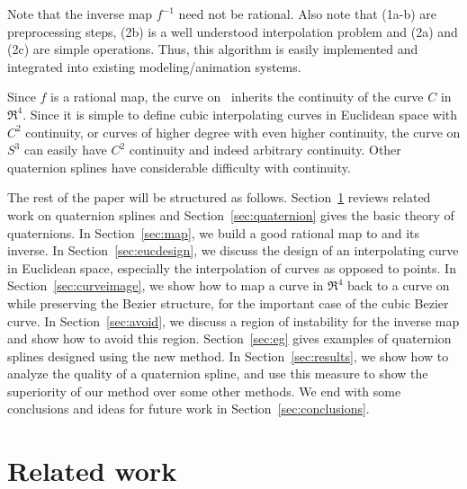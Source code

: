 Note that the inverse map $f^{-1}$ need not be rational.
Also note that (1a-b) are preprocessing steps,
(2b) is a well understood interpolation problem
and (2a) and (2c) are simple operations.
Thus, this algorithm is easily implemented and integrated into
existing modeling/animation systems.

Since $f$ is a rational map,
the curve on \ inherits the continuity of the curve $C$ in $\Re^4$.
Since it is simple to define cubic interpolating curves
in Euclidean space with $C^2$ continuity, or curves of higher degree with
even higher continuity, the curve on $S^3$ can easily have $C^2$ continuity
and indeed arbitrary continuity.
Other quaternion splines have considerable difficulty with continuity.

The rest of the paper will be structured as follows.
Section~\ref{sec:prevwork} reviews related work on quaternion splines
and Section~\ref{sec:quaternion} gives the basic theory of quaternions.
In Section~\ref{sec:map}, we build a good rational map to  and its inverse.
In Section~\ref{sec:eucdesign},
we discuss the design of an interpolating curve in Euclidean space,
especially the interpolation of curves as opposed to points. 
In Section~\ref{sec:curveimage}, we show how to map a curve in $\Re^4$
back to a curve on  while preserving the Bezier structure,
for the important case of the cubic Bezier curve.
In Section~\ref{sec:avoid}, we discuss a region of instability 
for the inverse map and show how to avoid this region.
Section~\ref{sec:eg} gives examples of quaternion splines designed using the
new method.	
In Section~\ref{sec:results}, we show how to analyze the quality of a 
quaternion spline, and use this measure to show the superiority
of our method over some other methods.
We end with some conclusions and ideas for future work in 
Section~\ref{sec:conclusions}.

\section{Related work}
\label{sec:prevwork}


